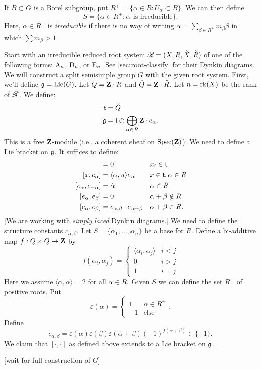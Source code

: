 If $B\subset G$ is a Borel subgroup, put 
$R^+=\{\alpha\in R:U_\alpha\subset B\}$. We can then define 
\[
  S = \{\alpha\in R^+:\alpha\text{ is irreducible}\} .
\]
Here, $\alpha\in R^+$ is \emph{irreducible} if there is no way of writing 
$\alpha=\sum_{\beta\in R^+} m_\beta \beta$ in which $\sum m_\beta>1$. 

Start with an irreducible reduced root system $\mathscr{R}=(X,R,\check X,\check R)$ of 
one of the following forms: $\mathrm{A}_n$, $\mathrm{D}_n$, or $\mathrm{E}_n$. See 
\autoref{sec:root-classify} for their Dynkin diagrams. We will construct a 
split semisimple group $G$ with the given root system. First, we'll define 
$\mathfrak{g}=\operatorname{Lie}(G)$. Let $Q=\mathbf{Z}\cdot R$ and $\check Q=\mathbf{Z}\cdot \check R$. Let 
$n=\operatorname{rk}(X)$ be the rank of $\mathscr{R}$. We define: 
\begin{align*}
  \mathfrak{t} &= \check Q \\
  \mathfrak{g} &= \mathfrak{t}\oplus \bigoplus_{\alpha\in R} \mathbf{Z}\cdot e_\alpha .
\end{align*}
This is a free $\mathbf{Z}$-module (i.e., a coherent sheaf on $\operatorname{Spec}(\mathbf{Z})$). We 
need to define a Lie bracket on $\mathfrak{g}$. It suffices to define: 
\begin{align*}
  [x_1,x_2] &= 0 && x_i\in \ft \\
  [x,e_\alpha] &= \langle \alpha,u\rangle e_\alpha && x\in \ft, \alpha\in R \\
  [e_\alpha,e_{-\alpha}] &= \check\alpha && \alpha\in R \\
  [e_\alpha,e_\beta] &= 0 && \alpha+\beta\notin R \\
  [e_\alpha,e_\beta] &= c_{\alpha,\beta} \cdot e_{\alpha+\beta} && \alpha+\beta\in R .
\end{align*}
[We are working with \emph{simply laced} Dynkin diagrams.] We need to define 
the structure constants $c_{\alpha,\beta}$. Let $S=\{\alpha_1,\dots,\alpha_n\}$ 
be a base for $R$. Define a bi-additive map $f:Q\times Q\to \mathbf{Z}$ by 
\[
  f(\alpha_i,\alpha_j) = \begin{cases} \langle \alpha_i,\alpha_j\rangle & i<j \\ 0 & i>j \\ 1 & i=j \end{cases} 
\]
Here we assume $\langle\alpha,\alpha\rangle=2$ for all $\alpha\in R$. Given $S$ 
we can define the set $R^+$ of positive roots. Put 
\[
  \varepsilon(\alpha) = \begin{cases} 1 & \alpha\in R^+ \\ -1 & \text{else} \end{cases} .
\]
Define 
\[
  c_{\alpha,\beta} = \varepsilon(\alpha)\varepsilon(\beta) \varepsilon(\alpha+\beta) (-1)^{f(\alpha+\beta)}\in \{\pm 1\} .
\]
We claim that $[\cdot,\cdot]$ as defined above extends to a Lie bracket on 
$\mathfrak{g}$. 

[wait for full construction of $G$]




